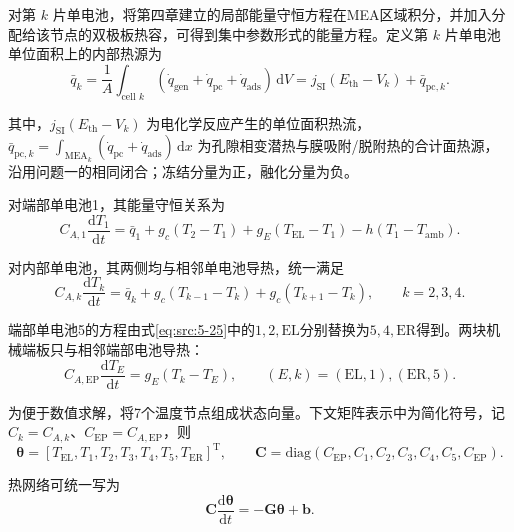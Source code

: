 \documentclass[bwprint]{gmcmthesis}
\numberwithin{equation}{section}
\numberwithin{figure}{section}
\begin{document}
 对第 \(k\) 片单电池，将第四章建立的局部能量守恒方程在MEA区域积分，并加入分配给该节点的双极板热容，可得到集中参数形式的能量方程。定义第 \(k\) 片单电池单位面积上的内部热源为
\begin{equation}
\bar{q}_k = \frac{1}{A} \int_{\text{cell } k} (\dot{q}_{\text{gen}} + \dot{q}_{\text{pc}} + \dot{q}_{\text{ads}}) \, \mathrm{d}V = j_{\mathrm{SI}}(E_{\text{th}} - V_k) + \bar{q}_{\text{pc},k}. \label{eq:src:5-24}
\end{equation}

 其中，\(j_{\mathrm{SI}}(E_{\text{th}} - V_k)\) 为电化学反应产生的单位面积热流，$\bar q_{\mathrm{pc},k}=\int_{\mathrm{MEA}_k}(\dot q_{\mathrm{pc}}+\dot q_{\mathrm{ads}})\,\mathrm dx$ 为孔隙相变潜热与膜吸附/脱附热的合计面热源，沿用问题一的相同闭合；冻结分量为正，融化分量为负。

 对端部单电池1，其能量守恒关系为
\begin{equation}
C_{A,1} \frac{\mathrm{d}T_1}{\mathrm{d}t} = \bar{q}_1 + g_c(T_2 - T_1) + g_E(T_{\text{EL}} - T_1) - h(T_1 - T_{\text{amb}}). \label{eq:src:5-25}
\end{equation}

 对内部单电池，其两侧均与相邻单电池导热，统一满足
\begin{equation}
C_{A,k}\frac{\mathrm dT_k}{\mathrm dt}=\bar q_k+g_c(T_{k-1}-T_k)+g_c(T_{k+1}-T_k),\qquad k=2,3,4.\label{eq:src:5-26}
\end{equation}

 端部单电池5的方程由式\eqref{eq:src:5-25}中的$1,2,\mathrm{EL}$分别替换为$5,4,\mathrm{ER}$得到。两块机械端板只与相邻端部电池导热：
\begin{equation}
C_{A,\mathrm{EP}}\frac{\mathrm dT_E}{\mathrm dt}=g_E(T_k-T_E),\qquad(E,k)=(\mathrm{EL},1),(\mathrm{ER},5).\label{eq:src:5-30}
\end{equation}

 为便于数值求解，将7个温度节点组成状态向量。下文矩阵表示中为简化符号，记 \(C_k = C_{A,k}\)、\(C_{\text{EP}} = C_{A,\text{EP}}\)，则
\begin{equation}
\boldsymbol{\theta} = [T_{\text{EL}}, T_1, T_2, T_3, T_4, T_5, T_{\text{ER}}]^{\text{T}}, \qquad \mathbf{C} = \text{diag}(C_{\text{EP}}, C_1, C_2, C_3, C_4, C_5, C_{\text{EP}}). \label{eq:src:5-32}
\end{equation}

 热网络可统一写为
\begin{equation}
\mathbf{C} \frac{\text{d}\boldsymbol{\theta}}{\text{d}t} = -\mathbf{G}\boldsymbol{\theta} + \mathbf{b}. \label{eq:src:5-33}
\end{equation}
\end{document}
